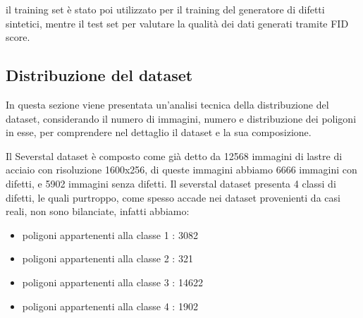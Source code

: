 il training set è stato poi utilizzato per il training del generatore di difetti sintetici, mentre il test set per valutare la qualità dei dati generati
tramite FID score.

\subsection{Distribuzione del dataset}

In questa sezione viene presentata un'analisi tecnica della distribuzione del dataset, considerando il numero di immagini,
numero e distribuzione dei poligoni in esse, per comprendere nel dettaglio il dataset e la sua composizione.

Il Severstal dataset è composto come già detto da 12568 immagini di lastre di acciaio con risoluzione 1600x256,
di queste immagini abbiamo 6666 immagini con difetti, e 5902 immagini senza difetti. Il severstal dataset presenta 4 classi di difetti,
le quali purtroppo, come spesso accade nei dataset provenienti da casi reali, non sono bilanciate, infatti abbiamo:
\begin{itemize}
    \item poligoni appartenenti alla classe 1 : 3082 
    \item poligoni appartenenti alla classe 2 : 321
    \item poligoni appartenenti alla classe 3 : 14622
    \item poligoni appartenenti alla classe 4 : 1902
\end{itemize}

